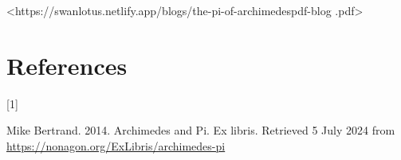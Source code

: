 \documentclass[
  a4paper,
]{article}
\newlength{\cslhangindent}
\newlength{\csllabelwidth}
\newenvironment{CSLReferences}[2] %
 {\begin{list}{}{%
  \setlength{\itemindent}{0pt}
  \setlength{\leftmargin}{0pt}
  \setlength{\parsep}{0pt}
  \ifodd #1
   \setlength{\leftmargin}{\cslhangindent}
   \setlength{\itemindent}{-1\cslhangindent}
  \fi
  \setlength{\itemsep}{#2\baselineskip}}}
 {\end{list}}
\newcommand{\CSLLeftMargin}[1]{\parbox[t]{\csllabelwidth}{\strut#1\strut}}
\newcommand{\CSLRightInline}[1]{\parbox[t]{\linewidth - \csllabelwidth}{\strut#1\strut}}
\begin{document}
\begin{small}

\begin{sffamily}

\textless https://swanlotus.netlify.app/blogs/the-pi-of-archimedespdf-blog
.pdf\textgreater{}

\end{sffamily}

\end{small}

\section*{References}\label{bibliography}

\label{refs}
\begin{CSLReferences}{0}{0}
\CSLLeftMargin{{[}1{]} }%
\CSLRightInline{Mike Bertrand. 2014. {Archimedes and Pi}. Ex libris.
Retrieved 5 July 2024 from
\url{https://nonagon.org/ExLibris/archimedes-pi}}

\end{CSLReferences}
\end{document}
